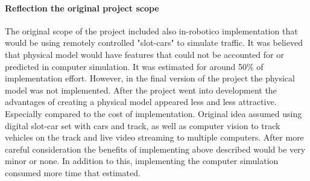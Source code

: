 \documentclass[11pt,english]{article}
\begin{document}

























\paragraph{Reflection the original project scope}

The original scope of the project included also in-robotico implementation that would be using remotely controlled "slot-cars" to simulate traffic. It was believed that physical model would have features that could not be accounted for or predicted in computer simulation. It was estimated for around 50\% of implementation effort. However, in the final version of the project the physical model was not implemented. After the project went into development the advantages of creating a physical model appeared less and less attractive. Especially compared to the cost of implementation. Original idea assumed using digital slot-car set with cars and track, as well as computer vision to track vehicles on the track and live video streaming to multiple computers. After more careful consideration the benefits of implementing above described would be very minor or none. In addition to this, implementing the computer simulation consumed more time that estimated. 
\end{document}

